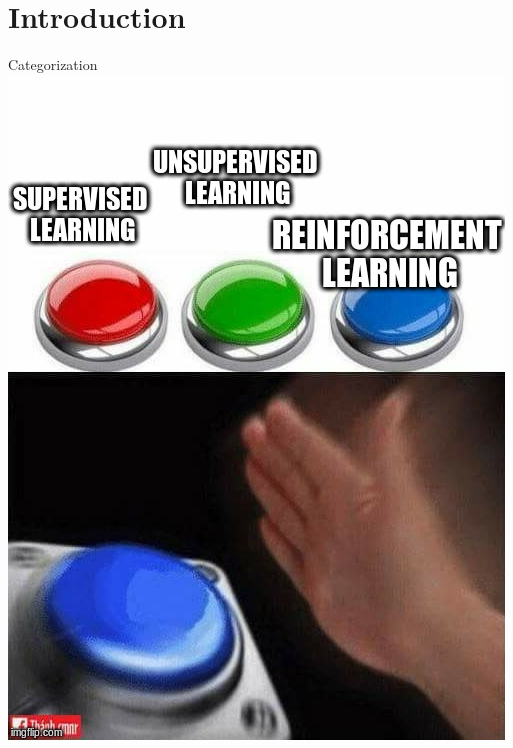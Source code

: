 \documentclass{beamer}
\newcommand{\secimage}{example-image-a}
\begin{document}
  {
    \renewcommand{\secimage}{Images/tic-tac-toe-hand-drawn-game}
  \section{Introduction}
    }


\begin{frame}{Categorization}
	\centering
	\includegraphics[width=0.6\linewidth]{Images/reinforcementbutton.jpg}
\end{frame}

\end{document}
